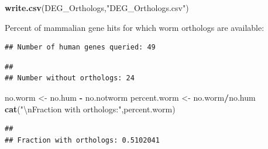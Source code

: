 \documentclass[
]{article}
\newenvironment{Shaded}{\begin{snugshade}}{\end{snugshade}}
\newcommand{\CharTok}[1]{\textcolor[rgb]{0.31,0.60,0.02}{#1}}
\newcommand{\KeywordTok}[1]{\textcolor[rgb]{0.13,0.29,0.53}{\textbf{#1}}}
\newcommand{\NormalTok}[1]{#1}
\newcommand{\OperatorTok}[1]{\textcolor[rgb]{0.81,0.36,0.00}{\textbf{#1}}}
\newcommand{\StringTok}[1]{\textcolor[rgb]{0.31,0.60,0.02}{#1}}
\begin{document}
\begin{Shaded}
\begin{Highlighting}[]
\KeywordTok{write.csv}\NormalTok{(DEG_Orthologs,}\StringTok{"DEG_Orthologs.csv"}\NormalTok{)}
\end{Highlighting}
\end{Shaded}

Percent of mammalian gene hits for which worm orthologs are available:

\begin{Shaded}
\end{Shaded}

\begin{verbatim}
## Number of human genes queried: 49
\end{verbatim}

\begin{Shaded}
\end{Shaded}

\begin{verbatim}
## 
## Number without orthologs: 24
\end{verbatim}

\begin{Shaded}
\begin{Highlighting}[]
\NormalTok{no.worm <-}\StringTok{ }\NormalTok{no.hum }\OperatorTok{-}\StringTok{ }\NormalTok{no.notworm}
\NormalTok{percent.worm <-}\StringTok{ }\NormalTok{no.worm}\OperatorTok{/}\NormalTok{no.hum}
\KeywordTok{cat}\NormalTok{(}\StringTok{"}\CharTok{\textbackslash{}n}\StringTok{Fraction with orthologs:"}\NormalTok{,percent.worm)}
\end{Highlighting}
\end{Shaded}

\begin{verbatim}
## 
## Fraction with orthologs: 0.5102041
\end{verbatim}
\end{document}
